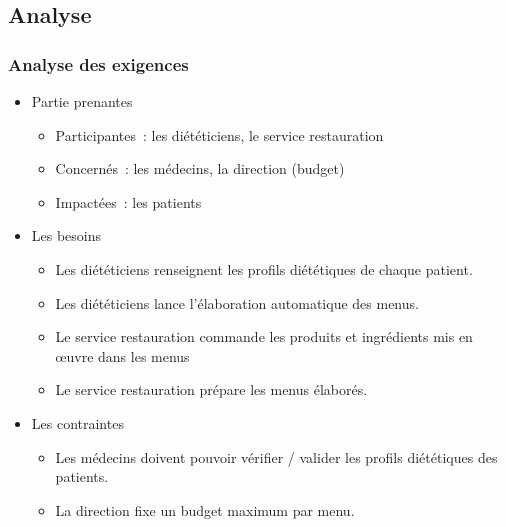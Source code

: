 \documentclass{beamer}
\begin{document}
\subsection{Analyse}
\begin{frame}[label=analyseDesExigences] %
\frametitle{Analyse des exigences}
\begin{itemize}
  \item Partie prenantes
  \begin{itemize}
    \item Participantes~: les diététiciens, le service restauration
    \item Concernés~: les médecins, la direction (budget)
    \item Impactées~: les patients
  \end{itemize}
  \item Les besoins
  \begin{itemize}
    \item Les diététiciens renseignent les profils diététiques de chaque patient.
    \item Les diététiciens lance l'élaboration automatique des menus.
    \item Le service restauration commande les produits et ingrédients mis en œuvre dans les menus
    \item Le service restauration prépare les menus élaborés.
  \end{itemize}
  \item Les contraintes
  \begin{itemize}
    \item Les médecins doivent pouvoir vérifier / valider les profils diététiques des patients.
    \item La direction fixe un budget maximum par menu.
  \end{itemize}
\end{itemize}
\end{frame}
\end{document}
